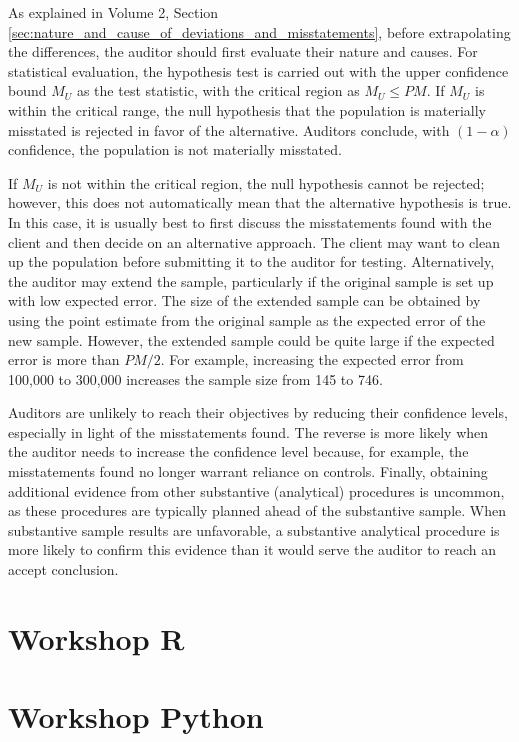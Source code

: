 As explained in Volume 2, Section \ref{sec:nature_and_cause_of_deviations_and_misstatements}, before extrapolating the differences, the auditor should first evaluate their nature and causes. For statistical evaluation, the hypothesis test is carried out with the upper confidence bound $M_U$ as the test statistic, with the critical region as $M_U \leq PM$. If $M_U$ is within the critical range, the null hypothesis that the population is materially misstated is rejected in favor of the alternative. Auditors conclude, with $(1 - \alpha)$ confidence, the population is not materially misstated.

If $M_U$ is not within the critical region, the null hypothesis cannot be rejected; however, this does not automatically mean that the alternative hypothesis is true. In this case, it is usually best to first discuss the misstatements found with the client and then decide on an alternative approach. The client may want to clean up the population before submitting it to the auditor for testing. Alternatively, the auditor may extend the sample, particularly if the original sample is set up with low expected error. The size of the extended sample can be obtained by using the point estimate from the original sample as the expected error of the new sample. However, the extended sample could be quite large if the expected error is more than $PM/2$. For example, increasing the expected error from 100,000 to 300,000 increases the sample size from 145 to 746.

Auditors are unlikely to reach their objectives by reducing their confidence levels, especially in light of the misstatements found. The reverse is more likely when the auditor needs to increase the confidence level because, for example, the misstatements found no longer warrant reliance on controls. Finally, obtaining additional evidence from other substantive (analytical) procedures is uncommon, as these procedures are typically planned ahead of the substantive sample. When substantive sample results are unfavorable, a substantive analytical procedure is more likely to confirm this evidence than it would serve the auditor to reach an accept conclusion.


\section{Workshop R} %
\label{sec:workshop05}




\section{Workshop Python} %
\label{sec:workshop05_python}




